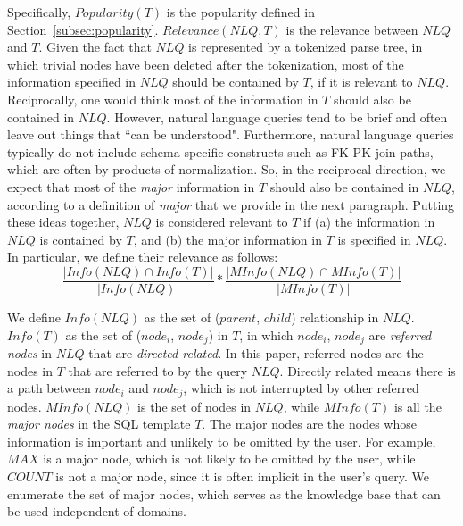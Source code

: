\documentclass{vldb}
\begin{document}
Specifically, $Popularity(T)$ is the popularity defined in Section~\ref{subsec:popularity}.  $Relevance(\mathit{NLQ}, T)$ is the relevance between $\mathit{NLQ}$ and $T$.  Given the fact that $\mathit{NLQ}$ is represented by a tokenized parse tree, in which trivial nodes have been deleted after the tokenization, most of the information specified in $\mathit{NLQ}$ should be contained by $T$, if it is relevant to $\mathit{NLQ}$.  Reciprocally, one would think most of the information in $T$ should also be contained in $\mathit{NLQ}$.  However, natural language queries tend to be brief and often leave out things that ``can be understood".  Furthermore, natural language queries typically do not include schema-specific constructs such as FK-PK join paths, which are often by-products of normalization.  So, in the reciprocal direction, we expect that most of the {\em major} information in $T$ should also be contained in $\mathit{NLQ}$, according to a definition of {\em major} that we provide in the next paragraph.  Putting these ideas together, $\mathit{NLQ}$ is considered relevant to $T$ if (a) the information in $\mathit{NLQ}$ is contained by $T$, and (b) the major information in $T$ is specified in $\mathit{NLQ}$.  In particular, we define their relevance as follows: 
\begin{displaymath}
\mathit{\frac{|Info(NLQ) \cap Info(T)|}{|Info(NLQ)|} * \frac{|MInfo(NLQ) \cap MInfo(T)|}{|MInfo(T)|}}
\end{displaymath}

We define $\mathit{Info(NLQ)}$ as the set of ($parent$, $child$) relationship in $\mathit{NLQ}$.  $Info(T)$ as the set of ($node_i$, $node_j$) in $T$, in which $node_i$, $node_j$ are \emph{referred nodes} in $\mathit{NLQ}$ that are \emph{directed related}.  In this paper, referred nodes are the nodes in $T$ that are referred to by the query $\mathit{NLQ}$.  Directly related means there is a path between $node_i$ and $node_j$, which is not interrupted by other referred nodes.  $\mathit{MInfo(NLQ)}$ is the set of nodes in $\mathit{NLQ}$, while $\mathit{MInfo(T)}$ is all the \emph{major nodes} in the SQL template $T$.  The major nodes are the nodes whose information is important and unlikely to be omitted by the user.  For example, $\mathit{MAX}$ is a major node, which is not likely to be omitted by the user, while $\mathit{COUNT}$ is not a major node, since it is often implicit in the user's query.  We enumerate the set of major nodes, which serves as the knowledge base that can be used independent of domains.  
\end{document}
